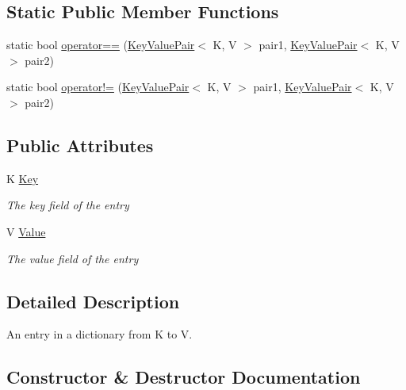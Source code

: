 \subsection*{Static Public Member Functions}
\begin{DoxyCompactItemize}
\item 
static bool \hyperlink{struct_c5_1_1_key_value_pair_aa5b86ede2357915f24cf154c520fd494}{operator==} (\hyperlink{struct_c5_1_1_key_value_pair}{Key\+Value\+Pair}$<$ K, V $>$ pair1, \hyperlink{struct_c5_1_1_key_value_pair}{Key\+Value\+Pair}$<$ K, V $>$ pair2)
\item 
static bool \hyperlink{struct_c5_1_1_key_value_pair_a7598a1d3688ab0c40e4a36a85e9e27d3}{operator!=} (\hyperlink{struct_c5_1_1_key_value_pair}{Key\+Value\+Pair}$<$ K, V $>$ pair1, \hyperlink{struct_c5_1_1_key_value_pair}{Key\+Value\+Pair}$<$ K, V $>$ pair2)
\end{DoxyCompactItemize}
\subsection*{Public Attributes}
\begin{DoxyCompactItemize}
\item 
K \hyperlink{struct_c5_1_1_key_value_pair_a17906f06fc12d12bd43c9b99f41ebb66}{Key}
\begin{DoxyCompactList}\small\item\em The key field of the entry \end{DoxyCompactList}\item 
V \hyperlink{struct_c5_1_1_key_value_pair_ab40dcc96269636dfc071c0a61fc5e1bc}{Value}
\begin{DoxyCompactList}\small\item\em The value field of the entry \end{DoxyCompactList}\end{DoxyCompactItemize}


\subsection{Detailed Description}
An entry in a dictionary from K to V. 



\subsection{Constructor \& Destructor Documentation}
\hypertarget{struct_c5_1_1_key_value_pair_a2f037505ab6ee6564c47037dd07b5a47}{}
